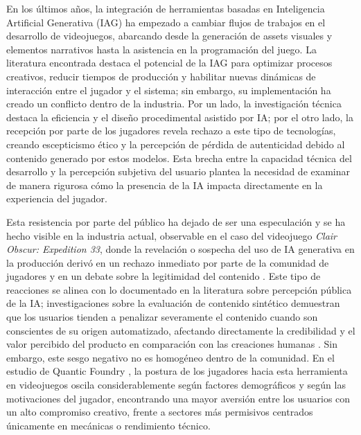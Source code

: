 En los últimos años, la integración de herramientas basadas en Inteligencia Artificial Generativa (IAG) ha empezado a cambiar flujos de trabajos en el desarrollo de videojuegos, abarcando desde la generación de assets visuales y elementos narrativos hasta la asistencia en la programación del juego. La literatura encontrada destaca el potencial de la IAG para optimizar procesos creativos, reducir tiempos de producción y habilitar nuevas dinámicas de interacción entre el jugador y el sistema; sin embargo, su implementación ha creado un conflicto dentro de la industria. Por un lado, la investigación técnica destaca la eficiencia y el diseño procedimental asistido por IA; por el otro lado, la recepción por parte de los jugadores revela rechazo a este tipo de tecnologías, creando escepticismo ético y la percepción de pérdida de autenticidad debido al contenido generado por estos modelos. Esta brecha entre la capacidad técnica del desarrollo y la percepción subjetiva del usuario plantea la necesidad de examinar de manera rigurosa cómo la presencia de la IA impacta directamente en la experiencia del jugador.  

Esta resistencia por parte del público ha dejado de ser una especulación y se ha hecho visible en la industria actual, observable en el caso del videojuego \textit{Clair Obscur: Expedition 33}, donde la revelación o sospecha del uso de IA generativa en la producción derivó en un rechazo inmediato por parte de la comunidad de jugadores y en un debate sobre la legitimidad del contenido \cite{hollyhead2026clair}. Este tipo de reacciones se alinea con lo documentado en la literatura sobre percepción pública de la IA; investigaciones sobre la evaluación de contenido sintético demuestran que los usuarios tienden a penalizar severamente el contenido cuando son conscientes de su origen automatizado, afectando directamente la credibilidad y el valor percibido del producto en comparación con las creaciones humanas \cite{huschens2023}. Sin embargo, este sesgo negativo no es homogéneo dentro de la comunidad. En el estudio de Quantic Foundry \cite{yee2025genai}, la postura de los jugadores hacia esta herramienta en videojuegos oscila considerablemente según factores demográficos y según las motivaciones del jugador, encontrando una mayor aversión entre los usuarios con un alto compromiso creativo, frente a sectores más permisivos centrados únicamente en mecánicas o rendimiento técnico.


